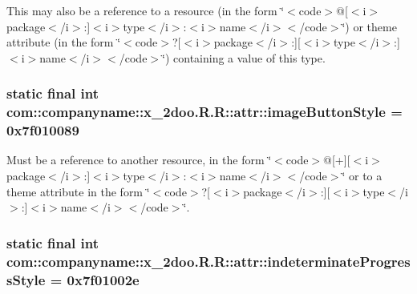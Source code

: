This may also be a reference to a resource (in the form \char`\"{}$<$code$>$@\mbox{[}$<$i$>$package$<$/i$>$:\mbox{]}$<$i$>$type$<$/i$>$:$<$i$>$name$<$/i$>$$<$/code$>$\char`\"{}) or theme attribute (in the form \char`\"{}$<$code$>$?\mbox{[}$<$i$>$package$<$/i$>$:\mbox{]}\mbox{[}$<$i$>$type$<$/i$>$:\mbox{]}$<$i$>$name$<$/i$>$$<$/code$>$\char`\"{}) containing a value of this type. \hypertarget{classcom_1_1companyname_1_1x__2doo_1_1_r_1_1attr_9a07b613541a06f3397f8ce0360b5bb9}{
\subsubsection[{imageButtonStyle}]{\setlength{\rightskip}{0pt plus 5cm}static final int com::companyname::x\_\-2doo.R.R::attr::imageButtonStyle = 0x7f010089}}
\label{classcom_1_1companyname_1_1x__2doo_1_1_r_1_1attr_9a07b613541a06f3397f8ce0360b5bb9}


Must be a reference to another resource, in the form \char`\"{}$<$code$>$@\mbox{[}+\mbox{]}\mbox{[}$<$i$>$package$<$/i$>$:\mbox{]}$<$i$>$type$<$/i$>$:$<$i$>$name$<$/i$>$$<$/code$>$\char`\"{} or to a theme attribute in the form \char`\"{}$<$code$>$?\mbox{[}$<$i$>$package$<$/i$>$:\mbox{]}\mbox{[}$<$i$>$type$<$/i$>$:\mbox{]}$<$i$>$name$<$/i$>$$<$/code$>$\char`\"{}. \hypertarget{classcom_1_1companyname_1_1x__2doo_1_1_r_1_1attr_5351683349dd0af98afbfef8154b47c4}{
\subsubsection[{indeterminateProgressStyle}]{\setlength{\rightskip}{0pt plus 5cm}static final int com::companyname::x\_\-2doo.R.R::attr::indeterminateProgressStyle = 0x7f01002e}}
\label{classcom_1_1companyname_1_1x__2doo_1_1_r_1_1attr_5351683349dd0af98afbfef8154b47c4}



